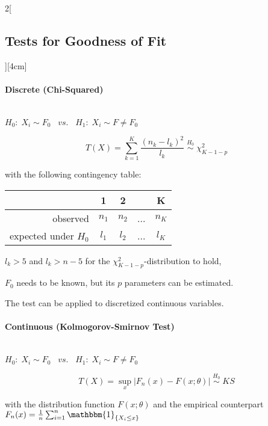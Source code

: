 \documentclass[8pt]{extarticle}
\begin{document}
\begin{multicols}{2}[\subsection{Tests for Goodness of Fit}][4cm]

\paragraph{Discrete (Chi-Squared)} \ \\
  
  \noindent $H_0\!:\; X_i \sim F_0 \;\;\; vs. \;\;\; H_1\!:\; X_i \sim F \neq F_0$
  
  $$T(X) = \sum_{k=1}^K \frac{(n_k - l_k)^2}{l_k} \; \overset{H_0}{\sim}\; \chi^2_{K-1-p}$$
  
  with the following contingency table:
  
  \begin{center}
  \begin{tabular}{r|cccc}
  & 1 & 2 & & K\\
  \hline
  observed & $n_1$ & $n_2$ & ... & $n_K$\\
  expected under $H_0$ & $l_1$ & $l_2$ & ... & $l_K$\\
  \end{tabular}
  \end{center}

\noindent $l_k>5$ and $l_k>n-5$ for the $\chi^2_{K-1-p}$-distribution to hold, 

\noindent $F_0$ needs to be known, but its $p$ parameters can be estimated.

\noindent The test can be applied to discretized continuous variables. 

\paragraph{Continuous (Kolmogorov-Smirnov Test)} \ \\
  
  \noindent $H_0\!:\; X_i \sim F_0 \;\;\; vs. \;\;\; H_1\!:\; X_i \sim F \neq F_0$
  
  $$T(X) = \sup_x |F_n(x) - F(x;\theta)| \; \overset{H_0}{\sim}\; KS$$

\noindent with the distribution function $F(x;\theta)$ and the empirical counterpart $F_n(x) = \frac{1}{n}\sum_{i=1}^n \mathbbm{1}_{\{X_i\leq x\}}$



\end{multicols}
\end{document}
